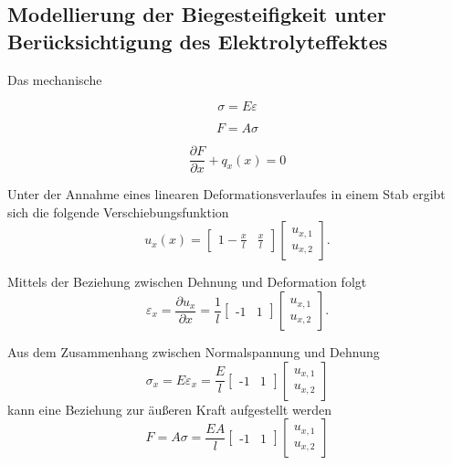 \subsection{Modellierung der Biegesteifigkeit unter Berücksichtigung des Elektrolyteffektes}

Das mechanische




\begin{equation}
    \sigma = E \varepsilon
\end{equation}

\begin{equation}
    F = A \sigma
\end{equation}

\begin{equation}
    \frac{\partial F}{\partial x}+ q_x(x) = 0
\end{equation}

Unter der Annahme eines linearen Deformationsverlaufes in einem Stab ergibt sich die folgende Verschiebungsfunktion 
\begin{equation}
    u_x(x) = \begin{bmatrix} 1-\frac{x}{l} & \frac{x}{l} \end{bmatrix}\begin{bmatrix} 
        u_{x,1} \\
        u_{x,2} 
    \end{bmatrix}.
\end{equation}

Mittels der Beziehung zwischen Dehnung und Deformation folgt 
\begin{equation}
    \varepsilon_x = \frac{\partial u_x}{\partial x} = 
    \frac{1}{l}
    \begin{bmatrix} 
        \text{-}1 & 1 
    \end{bmatrix}
    \begin{bmatrix} 
        u_{x,1} \\
        u_{x,2} 
    \end{bmatrix}.
\end{equation}

Aus dem Zusammenhang zwischen Normalspannung und Dehnung
\begin{equation}
    \sigma_x = E \varepsilon_x = 
    \frac{E}{l}
    \begin{bmatrix} 
        \text{-}1 & 1 
    \end{bmatrix}
    \begin{bmatrix} 
        u_{x,1} \\
        u_{x,2} 
    \end{bmatrix}
\end{equation}
kann eine Beziehung zur äußeren Kraft aufgestellt werden
\begin{equation}
    F = A \sigma = 
    \frac{EA}{l}
    \begin{bmatrix} 
        \text{-}1 & 1 
    \end{bmatrix}
    \begin{bmatrix} 
        u_{x,1} \\
        u_{x,2} 
    \end{bmatrix}
\end{equation}

